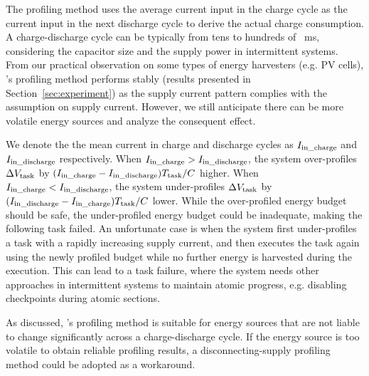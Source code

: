 The profiling method uses the average current input in the charge cycle as the current input in the next discharge cycle to derive the actual charge consumption. 
A charge-discharge cycle can be typically from tens to hundreds of \SI{}{\milli\second}, considering the capacitor size and the supply power in intermittent systems.
From our practical observation on some types of energy harvesters (e.g. PV cells), \nn{}'s profiling method performs stably (results presented in Section~\ref{sec:experiment}) as the supply current pattern complies with the assumption on supply current. 
However, we still anticipate there can be more volatile energy sources and analyze the consequent effect. 


We denote the the mean current in charge and discharge cycles as $I_{\text{in\_charge}}$ and $I_{\text{in\_discharge}}$ respectively. 
When $I_{\text{in\_charge}} > I_{\text{in\_discharge}}$, the system over-profiles $\Delta V_{\text{task}}$ by $(I_{\text{in\_charge}} - I_{\text{in\_discharge}}) T_{\text{task}} / C$ higher. 
When $I_{\text{in\_charge}} < I_{\text{in\_discharge}}$, the system under-profiles $\Delta V_{\text{task}}$ by $(I_{\text{in\_discharge}} - I_{\text{in\_charge}}) T_{\text{task}} / C$ lower. 
While the over-profiled energy budget should be safe, the under-profiled energy budget could be inadequate, making the following task failed. 
An unfortunate case is when the system first under-profiles a task with a rapidly increasing supply current, and then executes the task again using the newly profiled budget while no further energy is harvested during the execution. 
This can lead to a task failure, where the system needs other approaches in intermittent systems to maintain atomic progress, e.g. disabling checkpoints during atomic sections.

As discussed, \nn{}'s profiling method is suitable for energy sources that are not liable to change significantly across a charge-discharge cycle. 
If the energy source is too volatile to obtain reliable profiling results, a disconnecting-supply profiling method could be adopted as a workaround. 

